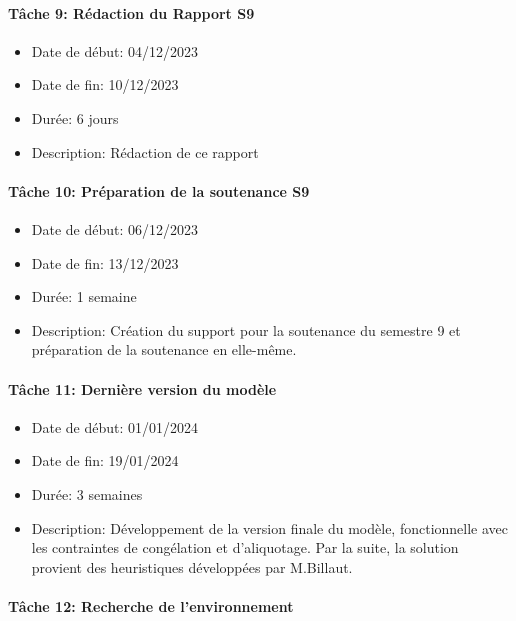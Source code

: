 \documentclass{polytech/polytech}
\numberwithin{figure}{chapter}
\begin{document}
\begin{appendix}
\paragraph{Tâche 9: Rédaction du Rapport S9}

\begin{itemize}
    \item Date de début: 04/12/2023
    \item Date de fin: 10/12/2023
    \item Durée: 6 jours
    \item
        Description: Rédaction de ce rapport
\end{itemize}

\paragraph{Tâche 10: Préparation de la soutenance S9}

\begin{itemize}
    \item Date de début: 06/12/2023
    \item Date de fin: 13/12/2023
    \item Durée: 1 semaine
    \item
        Description: Création du support pour la soutenance du semestre 9 et préparation de la soutenance en elle-même. 
\end{itemize}

\paragraph{Tâche 11: Dernière version du modèle}

\begin{itemize}
    \item Date de début: 01/01/2024
    \item Date de fin: 19/01/2024
    \item Durée: 3 semaines
    \item
        Description: Développement de la version finale du modèle, fonctionnelle avec les contraintes de congélation et d'\gls{aliquotage}. Par la suite, la solution provient des \glspl{heuristique} développées par M.Billaut. 
\end{itemize}

\paragraph{Tâche 12: Recherche de l'environnement}


\end{appendix}
\end{document}
